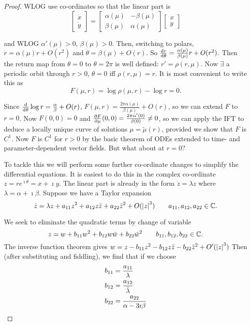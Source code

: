 \documentclass{notes}
\theoremstyle{plain}
\begin{document}
\begin{proof}
WLOG use co-ordinates so that the linear part is 
\[
\begin{bmatrix}
\dot{x} \\ \dot{y}
\end{bmatrix}
=
\begin{bmatrix}
\alpha(\mu) & - \beta(\mu) \\
\beta(\mu) & \alpha(\mu)
\end{bmatrix}
\begin{bmatrix}
x \\ y
\end{bmatrix}
\]

and WLOG $\alpha'(\mu) > 0$, $\beta(\mu)>0$.  Then, switching to polars,
$\dot{r} = \alpha(\mu) r + O(r^2)$ and $\dot{\theta} = \beta(\mu) + O(r)$.
So $\frac{\mathrm{d} r}{\mathrm{d}\theta}= \frac{\alpha(\mu)}{\beta(\mu)} r + O(r^2)$.
Then the return map from $\theta=0$ to $\theta = 2\pi$ is well defined:
$r' = \rho(r,\mu)$.  Now $\exists$ a periodic orbit through $r>0$,
$\theta=0$ iff $\rho(r,\mu)=r$.  It is most convenient to write this as
\[
F(\mu,r) = \log \rho (\mu,r) - \log r = 0.
\]

Since $\frac{\mathrm{d}}{\mathrm{d}\theta} \log r = \frac{\alpha}{\beta} + O(r)$,
$F(\mu,r) = \frac{2 \pi \alpha(\mu)}{\beta(\mu)} + O(r)$,
so we can extend $F$ to $r=0$.  Now $F(0,0)=0$ and $\frac{\partial F}{\partial \mu}(0,0)
= \frac{2 \pi \alpha'(0)}{\beta(0)} \neq 0$, so we can apply
the IFT to deduce a locally unique curve of solutions $\mu = \tilde{\mu}(r)$,
provided we show that $F$ is $C^1$.  Now $F$ is $C^1$ for $r>0$ by the
basic theorem of ODEs extended to time- and parameter-dependent vector fields.
But what about at $r=0$?

To tackle this we will perform some further co-ordinate changes to simplify
the differential equations.  It is easiest to do this in the complex
co-ordinate $z = r e^{\imath \theta} = x + \imath y$.  The linear part
is already in the form $\dot{z} = \lambda z$ where $\lambda = \alpha
+ \imath \beta$.  Suppose we have a Taylor expansion
\[
\dot{z} = \lambda z + a_{11} z^2 + a_{12} z \Bar{z} + a_{22} \Bar{z}^2
+ O(\left|z\right|^3) \qquad a_{11}, a_{12}, a_{22} \in \mathbb{C}.
\]

We seek to eliminate the quadratic terms by change of variable
\[
z = w + b_{11} w^2 + b_{12} w \Bar{w} + b_{22} \Bar{w}^2
\qquad b_{11}, b_{12}, b_{22} \in \mathbb{C}.
\]
The inverse function theorem gives
$w = z - b_{11} z^2 - b_{12} z \Bar{z} - b_{22} \Bar{z}^2 + O'(\left|z\right|^3)$
Then (after substituting and fiddling), we find that if we choose
\begin{align*}
b_{11} &= \frac{a_{11}}{\lambda} \\
b_{12} &= \frac{a_{12}}{\Bar{\lambda}} \\
b_{22} &= \frac{a_{22}}{\alpha - 3 \imath \beta}
\end{align*}


\end{proof}
\end{document}
